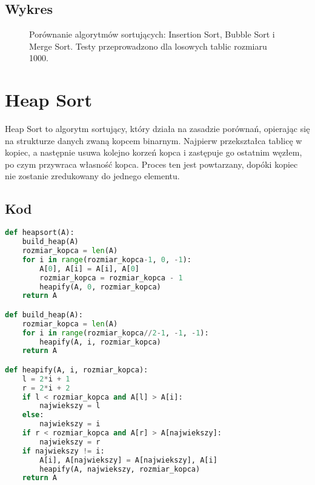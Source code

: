 \documentclass{article}
\begin{document}
\subsection{Wykres}
\begin{figure}[H]
\caption{Porównanie algorytmów sortujących: Insertion Sort, Bubble Sort i Merge Sort. Testy przeprowadzono dla losowych tablic rozmiaru 1000.}
\end{figure}



\section{Heap Sort}
Heap Sort to algorytm sortujący, który działa na zasadzie porównań, opierając się na strukturze danych zwaną kopcem binarnym. Najpierw przekształca tablicę w kopiec, a następnie usuwa kolejno korzeń kopca i zastępuje go ostatnim węzłem, po czym przywraca własność kopca. Proces ten jest powtarzany, dopóki kopiec nie zostanie zredukowany do jednego elementu.


\subsection{Kod}
\begin{lstlisting}[language=Python]
    def heapsort(A):
    build_heap(A)
    rozmiar_kopca = len(A)
    for i in range(rozmiar_kopca-1, 0, -1):
        A[0], A[i] = A[i], A[0]
        rozmiar_kopca = rozmiar_kopca - 1
        heapify(A, 0, rozmiar_kopca)
    return A

def build_heap(A):
    rozmiar_kopca = len(A)
    for i in range(rozmiar_kopca//2-1, -1, -1):
        heapify(A, i, rozmiar_kopca)
    return A

def heapify(A, i, rozmiar_kopca):
    l = 2*i + 1
    r = 2*i + 2
    if l < rozmiar_kopca and A[l] > A[i]:
        najwiekszy = l
    else: 
        najwiekszy = i
    if r < rozmiar_kopca and A[r] > A[najwiekszy]:
        najwiekszy = r
    if najwiekszy != i:
        A[i], A[najwiekszy] = A[najwiekszy], A[i]
        heapify(A, najwiekszy, rozmiar_kopca)
    return A
\end{lstlisting}
\end{document}
